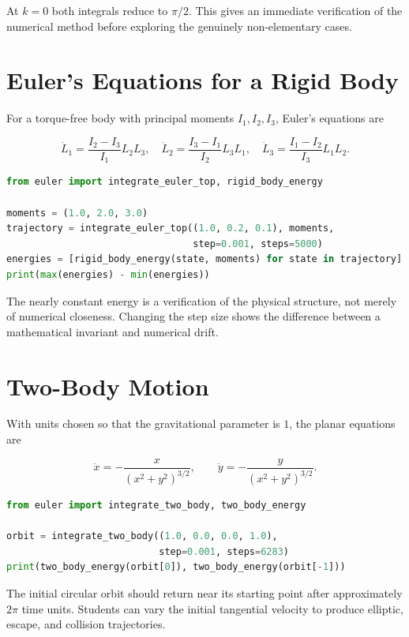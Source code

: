At $k=0$ both integrals reduce to $\pi/2$. This gives an immediate verification of
the numerical method before exploring the genuinely non-elementary cases.

\section{Euler's Equations for a Rigid Body}

For a torque-free body with principal moments $I_1,I_2,I_3$, Euler's equations are

\[
\dot L_1=\frac{I_2-I_3}{I_1}L_2L_3,
\quad
\dot L_2=\frac{I_3-I_1}{I_2}L_3L_1,
\quad
\dot L_3=\frac{I_1-I_2}{I_3}L_1L_2.
\]

\begin{lstlisting}[language=Python]
from euler import integrate_euler_top, rigid_body_energy

moments = (1.0, 2.0, 3.0)
trajectory = integrate_euler_top((1.0, 0.2, 0.1), moments,
                                 step=0.001, steps=5000)
energies = [rigid_body_energy(state, moments) for state in trajectory]
print(max(energies) - min(energies))
\end{lstlisting}

The nearly constant energy is a verification of the physical structure, not merely
of numerical closeness. Changing the step size shows the difference between a
mathematical invariant and numerical drift.

\section{Two-Body Motion}

With units chosen so that the gravitational parameter is $1$, the planar equations
are

\[
\ddot x=-\frac{x}{(x^2+y^2)^{3/2}},\qquad
\ddot y=-\frac{y}{(x^2+y^2)^{3/2}}.
\]

\begin{lstlisting}[language=Python]
from euler import integrate_two_body, two_body_energy

orbit = integrate_two_body((1.0, 0.0, 0.0, 1.0),
                           step=0.001, steps=6283)
print(two_body_energy(orbit[0]), two_body_energy(orbit[-1]))
\end{lstlisting}

The initial circular orbit should return near its starting point after approximately
$2\pi$ time units. Students can vary the initial tangential velocity to produce
elliptic, escape, and collision trajectories.

